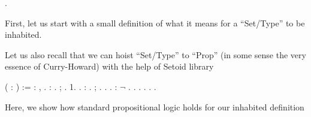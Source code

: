 \documentclass[12pt]{report}
\begin{document}

\begin{coqdoccode}
\coqdocnoindent
{}  .\coqdoceol
\end{coqdoccode}
  First, let us start with a small definition of
  what it means for a ``Set/Type'' to be inhabited.


  Let us also recall that we can hoist ``Set/Type''
  to ``Prop'' (in some sense the very essence of Curry-Howard)
  with the help of Setoid library

\begin{coqdoccode}
\coqdocnoindent
{}  ( : ) := \coqdoctac{\ensuremath{\exists}}  : , .\coqdoceol
\coqdocemptyline
\coqdocnoindent
{}  : \coqdoceol
\coqdocindent{1.00em}
 .\coqdoceol
\coqdocnoindent
{}; .\coqdoceol
\coqdocnoindent
{} 1.\coqdoceol
\coqdocnoindent
{}.\coqdoceol
\coqdocemptyline
\coqdocnoindent
{}  : \coqdoceol
\coqdocindent{1.00em}
 .\coqdoceol
\coqdocnoindent
{}; .\coqdoceol
\coqdocnoindent
{} .\coqdoceol
\coqdocnoindent
{}.\coqdoceol
\coqdocemptyline
\coqdocnoindent
{}  :\coqdoceol
\coqdocindent{1.00em}
\ensuremath{\lnot}  .\coqdoceol
\coqdocnoindent
{}.\coqdoceol
\coqdocindent{1.00em}
 .\coqdoceol
\coqdocindent{1.00em}
 .\coqdoceol
\coqdocindent{1.00em}
 .\coqdoceol
\coqdocnoindent
{}.\coqdoceol
\coqdocemptyline
\end{coqdoccode}
  Here, we show how standard propositional logic
  holds for our inhabited definition
\end{document}

